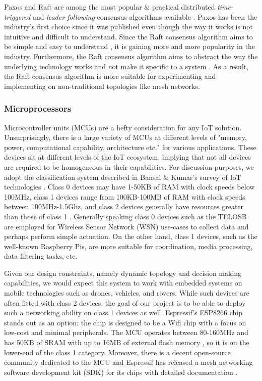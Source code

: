 \documentclass[compsoc]{IEEEtran}
\begin{document}
Paxos and Raft are among the most popular \& practical distributed \emph{time-triggered} and \emph{leader-following} consensus algorithms available \cite{paxos_vs_raft}. Paxos has been the industry's first choice since it was published even though the way it works is not intuitive and difficult to understand. Since the Raft consensus algorithm aims to be simple and easy to understand \cite{raft_paper}, it is gaining more and more popularity in the industry. Furthermore, the Raft consensus algorithm aims to abstract the way the underlying technology works and not make it specific to a system \cite{paxos_vs_raft}. As a result, the Raft consensus algorithm is more suitable for experimenting and implementing on non-traditional topologies like mesh networks.

\subsubsection{Microprocessors}
Microcontroller units (MCUs) are a hefty consideration for any IoT solution. Unsurprisingly, there is a large variety of MCUs at different levels of "memory, power, computational capability, architecture etc." \cite{bansal2020iotsurveydevices} for various applications. These devices sit at different levels of the IoT ecosystem, implying that not all devices are required to be homogeneous in their capabilities. For discussion purposes, we adopt the classification system described in Bansal & Kumar's survey of IoT technologies \cite{bansal2020iotsurveydevices}. Class 0 devices may have 1-50KB of RAM with clock speeds below 100MHz, class 1 devices range from 100KB-100MB of RAM with clock speeds between 100MHz-1.5Ghz, and class 2 devices generally have resources greater than those of class 1 \cite{bansal2020iotsurveydevices}. Generally speaking class 0 devices such as the TELOSB are employed for Wireless Sensor Network (WSN) use-cases to collect data and perhaps perform simple actuation. On the other hand, class 1 devices, such as the well-known Raspberry Pis, are more suitable for coordination, media processing, data filtering tasks, etc.

Given our design constraints, namely dynamic topology and decision making capabilities, we would expect this system to work with embedded systems on mobile technologies such as drones, vehicles, and rovers. While such devices are often fitted with class 2 devices, the goal of our project is to be able to deploy such a networking ability on class 1 devices as well. Espressif's ESP8266 chip stands out as an option: the chip is designed to be a Wifi chip with a focus on low-cost and minimal peripherals. The MCU operates between 80-160MHz and has 50KB of SRAM with up to 16MB of external flash memory \cite{espressif:esp8266}, so it is on the lower-end of the class 1 category. Moreover, there is a decent open-source community dedicated to the MCU and Espressif has released a mesh networking software development kit (SDK) for its chips with detailed documentation \cite{esp-mesh-docs}. 
\end{document}
